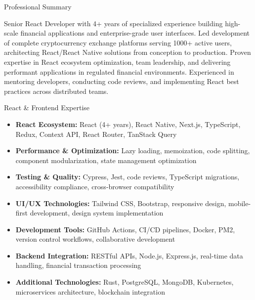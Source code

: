 \documentclass[]{mcdowellcv}
\begin{document}
	\makeheader
	
	\begin{cvsection}{Professional Summary}
		\begin{cvsubsection}{}{}{}
      Senior React Developer with 4+ years of specialized experience building high-scale financial applications and enterprise-grade user interfaces. Led development of complete cryptocurrency exchange platforms serving 1000+ active users, architecting React/React Native solutions from conception to production. Proven expertise in React ecosystem optimization, team leadership, and delivering performant applications in regulated financial environments. Experienced in mentoring developers, conducting code reviews, and implementing React best practices across distributed teams.
    \end{cvsubsection}
	\end{cvsection}

  \begin{cvsection}{React \& Frontend Expertise}
    \begin{cvsubsection}{}{}{}	
      \begin{itemize}
        \item \textbf{React Ecosystem:} React (4+ years), React Native, Next.js, TypeScript, Redux, Context API, React Router, TanStack Query
        \item \textbf{Performance \& Optimization:} Lazy loading, memoization, code splitting, component modularization, state management optimization
        \item \textbf{Testing \& Quality:} Cypress, Jest, code reviews, TypeScript migrations, accessibility compliance, cross-browser compatibility
        \item \textbf{UI/UX Technologies:} Tailwind CSS, Bootstrap, responsive design, mobile-first development, design system implementation
        \item \textbf{Development Tools:} GitHub Actions, CI/CD pipelines, Docker, PM2, version control workflows, collaborative development
        \item \textbf{Backend Integration:} RESTful APIs, Node.js, Express.js, real-time data handling, financial transaction processing
        \item \textbf{Additional Technologies:} Rust, PostgreSQL, MongoDB, Kubernetes, microservices architecture, blockchain integration
      \end{itemize}
    \end{cvsubsection}
  \end{cvsection}	
\end{document}
